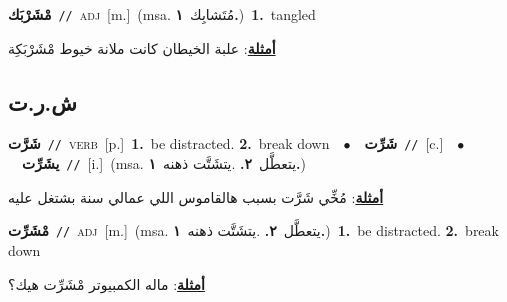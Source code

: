\documentclass[10pt,a4paper,twoside]{article} %
\begin{document}
\begin{multicols}{2}
{\setlength\topsep{0pt}\textbf{\foreignlanguage{arabic}{مْشَرْبَك}}\ {\color{gray}\texttt{//}\color{black}}\ \textsc{adj}\ [m.]\ \color{gray}(msa. \foreignlanguage{arabic}{مُتَشابِك}~\foreignlanguage{arabic}{\textbf{١.}})\color{black}\ \textbf{1.}~tangled\  \begin{flushright}\color{gray}\foreignlanguage{arabic}{\textbf{\underline{\foreignlanguage{arabic}{أمثلة}}}: علبة الخيطان كانت ملانة خيوط مْشَرْبَكِة}\end{flushright}\color{black}} \vspace{2mm}

\vspace{-3mm}
\subsection*{\color{blue}\foreignlanguage{arabic}{ش.ر.ت}\color{blue}{}} 

{\setlength\topsep{0pt}\textbf{\foreignlanguage{arabic}{شَرَّت}}\ {\color{gray}\texttt{//}\color{black}}\ \textsc{verb}\ [p.]\ \textbf{1.}~be distracted.  \textbf{2.}~break down\ \ $\bullet$\ \ \setlength\topsep{0pt}\textbf{\foreignlanguage{arabic}{شَرِّت}}\ {\color{gray}\texttt{//}\color{black}}\ [c.]\ \ $\bullet$\ \ \setlength\topsep{0pt}\textbf{\foreignlanguage{arabic}{يشَرِّت}}\ {\color{gray}\texttt{//}\color{black}}\ [i.]\ \color{gray}(msa. \foreignlanguage{arabic}{يتعطَّل}~\foreignlanguage{arabic}{\textbf{٢.}}  .\foreignlanguage{arabic}{يتشَتَّت ذهنه}~\foreignlanguage{arabic}{\textbf{١.}})\color{black}\  \begin{flushright}\color{gray}\foreignlanguage{arabic}{\textbf{\underline{\foreignlanguage{arabic}{أمثلة}}}: مُخِّي شَرَّت بسبب هالقاموس اللي عمالي سنة بشتغل عليه}\end{flushright}\color{black}} \vspace{2mm}

{\setlength\topsep{0pt}\textbf{\foreignlanguage{arabic}{مْشَرِّت}}\ {\color{gray}\texttt{//}\color{black}}\ \textsc{adj}\ [m.]\ \color{gray}(msa. \foreignlanguage{arabic}{يتعطَّل}~\foreignlanguage{arabic}{\textbf{٢.}}  .\foreignlanguage{arabic}{يتشَتَّت ذهنه}~\foreignlanguage{arabic}{\textbf{١.}})\color{black}\ \textbf{1.}~be distracted.  \textbf{2.}~break down\  \begin{flushright}\color{gray}\foreignlanguage{arabic}{\textbf{\underline{\foreignlanguage{arabic}{أمثلة}}}: ماله الكمبيوتر مْشَرِّت هيك؟}\end{flushright}\color{black}} \vspace{2mm}


\end{multicols}
\end{document}
